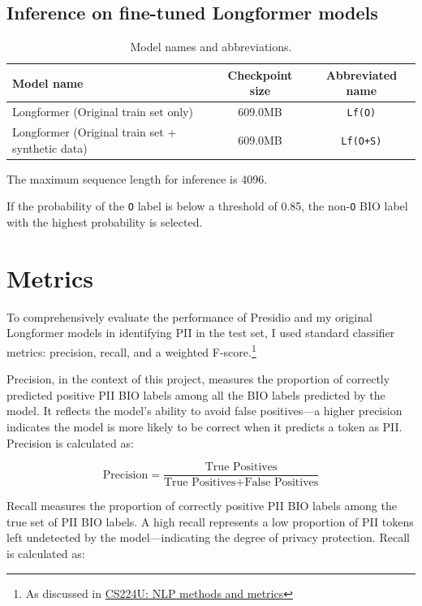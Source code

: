 \documentclass[11pt]{article}
\newcounter{savedfootnote}
\newcommand{\daggerfootnotes}{
    \setcounter{savedfootnote}{\value{footnote}} %
    \renewcommand{\thefootnote}{\fnsymbol{footnote}}
    \setcounter{footnote}{1} %
}
\newcommand{\numericfootnotes}{
    \setcounter{footnote}{\value{savedfootnote}} %
    \renewcommand{\thefootnote}{\arabic{footnote}}
}
\begin{document}
\subsection{Inference on fine-tuned Longformer models}

\begin{table}[t]
  \centering
  \caption{Model names and abbreviations.}
  \label{tab:model_specs}
  \begin{tabularx}{\textwidth}{Xcc}
    \toprule
    \textbf{Model name} & \textbf{Checkpoint size} & \textbf{Abbreviated name} \\
    \midrule
    Longformer (Original train set only) & 609.0MB & \texttt{Lf(O)} \\
    Longformer (Original train set + synthetic data) & 609.0MB & \texttt{Lf(O+S)} \\
    \bottomrule
  \end{tabularx}
\end{table}

The maximum sequence length for inference is 4096.

If the probability of the \texttt{O} label is below a threshold of 0.85, the non-\texttt{O} BIO label with the highest probability is selected.

\daggerfootnotes
\section{Metrics}
\numericfootnotes

To comprehensively evaluate the performance of Presidio and my original Longformer models in identifying PII in the test set, I used standard classifier metrics: precision, recall, and a weighted F-score.\footnote{As discussed in \href{https://web.stanford.edu/class/cs224u/slides/cs224u-methods-2023-handout.pdf}{CS224U: NLP methods and metrics}}

Precision, in the context of this project, measures the proportion of correctly predicted positive PII BIO labels among all the BIO labels predicted by the model. It reflects the model's ability to avoid false positives—a higher precision indicates the model is more likely to be correct when it predicts a token as PII. Precision is calculated as:

\begin{equation*}
\text{Precision} = \frac{\text{True Positives}}{\text{True Positives} + \text{False Positives}}
\end{equation*}

Recall measures the proportion of correctly positive PII BIO labels among the true set of PII BIO labels. A high recall represents a low proportion of PII tokens left undetected by the model—indicating the degree of privacy protection. Recall is calculated as:
\end{document}
